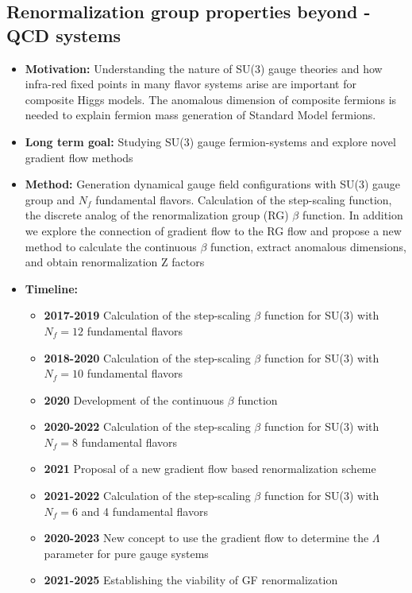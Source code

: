 \documentclass[12pt,hyperpdf]{article}
\begin{document}
\subsection{Renormalization group properties beyond - QCD systems }
\begin{itemize}
    \item{\bf Motivation:}
     Understanding the nature of SU(3) gauge theories and how infra-red
     fixed points in many flavor systems arise are important for composite Higgs models. The anomalous dimension of composite fermions is needed to explain fermion mass generation of Standard Model fermions.  
    \item{\bf Long term goal:} Studying SU(3) gauge fermion-systems and explore novel gradient flow methods
    \item{\bf Method:} Generation dynamical gauge field configurations with
     SU(3) gauge group and $N_f$ fundamental flavors. Calculation of
     the step-scaling function, the discrete analog of the
     renormalization group (RG) $\beta$ function. In addition we
     explore the connection of gradient flow to the RG flow and propose
     a new method to calculate the continuous $\beta$ function,
     extract anomalous dimensions, and obtain renormalization Z factors
    \item{\bf Timeline:}
\begin{itemize}
    \item{\bf 2017-2019} Calculation of the step-scaling $\beta$ function
     for SU(3) with $N_f=12$ fundamental flavors
    \item{\bf 2018-2020} Calculation of the step-scaling $\beta$ function
     for SU(3) with $N_f=10$ fundamental flavors
    \item{\bf 2020} Development of the continuous $\beta$ function
    \item{\bf 2020-2022} Calculation of the step-scaling $\beta$ function
     for SU(3) with $N_f=8$ fundamental flavors
    \item{\bf 2021} Proposal of a new gradient flow based renormalization
     scheme
    \item{\bf 2021-2022} Calculation of the step-scaling $\beta$ function
     for SU(3) with $N_f=6$ and 4 fundamental flavors
    \item{\bf 2020-2023} New concept to use the gradient flow to determine
     the $\Lambda$ parameter for pure gauge systems
    \item{\bf 2021-2025} Establishing the viability of GF renormalization
\end{itemize}
\end{itemize}
\end{document}
